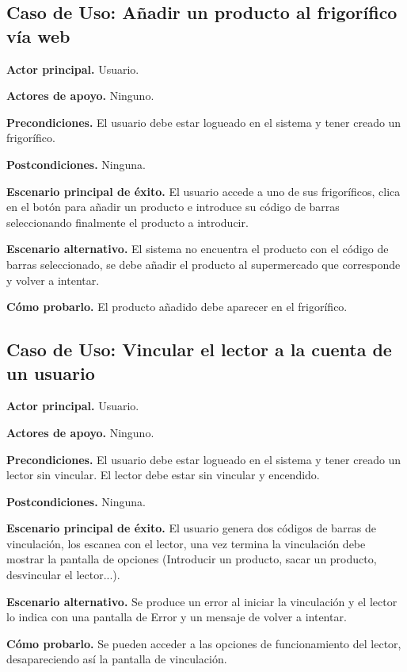 \subsection{Caso de Uso: Añadir un producto al frigorífico vía web}

    \textbf{Actor principal.} Usuario.

    \textbf{Actores de apoyo.} Ninguno.

    \textbf{Precondiciones.} El usuario debe estar logueado en el sistema y tener creado un frigorífico.

    \textbf{Postcondiciones.} Ninguna.

    \textbf{Escenario principal de éxito.} El usuario accede a uno de sus frigoríficos, clica en el botón para añadir un producto e introduce su código de barras seleccionando finalmente el producto a introducir.

    \textbf{Escenario alternativo.} El sistema no encuentra el producto con el código de barras seleccionado, se debe añadir el producto al supermercado que corresponde y volver a intentar.

    \textbf{Cómo probarlo.} El producto añadido debe aparecer en el frigorífico.

\subsection{Caso de Uso: Vincular el lector a la cuenta de un usuario}

    \textbf{Actor principal.} Usuario.

    \textbf{Actores de apoyo.} Ninguno.

    \textbf{Precondiciones.} El usuario debe estar logueado en el sistema y tener creado un lector sin vincular. El lector debe estar sin vincular y encendido.

    \textbf{Postcondiciones.} Ninguna.

    \textbf{Escenario principal de éxito.} El usuario genera dos códigos de barras de vinculación, los escanea con el lector, una vez termina la vinculación debe mostrar la pantalla de opciones (Introducir un producto, sacar un producto, desvincular el lector...).

    \textbf{Escenario alternativo.} Se produce un error al iniciar la vinculación y el lector lo indica con una pantalla de Error y un mensaje de volver a intentar.

    \textbf{Cómo probarlo.} Se pueden acceder a las opciones de funcionamiento del lector, desapareciendo así la pantalla de vinculación.

